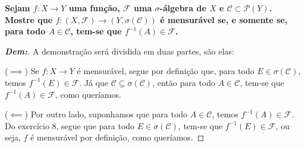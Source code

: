 \biglinend
{}
\bigline 
\textbf{Sejam $f: X \rightarrow Y$ uma função, $\mathcal F$ uma $\sigma$-álgebra de $X$ e $\mathcal C \subset \mathcal P(Y)$. 
Mostre que $f: (X, \mathcal F) \rightarrow (Y, \sigma(\mathcal C))$ é mensurável se, e somente se, 
para todo $A \in \mathcal C$, tem-se que $f^{-1}(A) \in \mathcal F$.}
\begin{proof}[\textbf{Dem:}]
  A demonstração será dividida em duas partes, são elas:

  ($\implies$) Se $f: X \rightarrow Y$ é mensurável, segue por definição que, para todo $E \in \sigma(\mathcal C)$, 
  temos $f^{-1}(E) \in \mathcal F$. Já que $\mathcal C \subseteq \sigma(\mathcal C)$, então para todo $A \in \mathcal C$, 
  tem-se que $f^{-1}(A) \in \mathcal F$, como queríamos.

  ($\impliedby$) Por outro lado, suponhamos que para todo $A \in \mathcal C$, temos $f^{-1}(A) \in \mathcal F$. Do exercício 
  8, segue que para todo $E \in \sigma(\mathcal C)$, tem-se que $f^{-1}(E) \in \mathcal F$, ou seja, $f$ é mensurável por 
  definição, como queríamos.
\end{proof}
